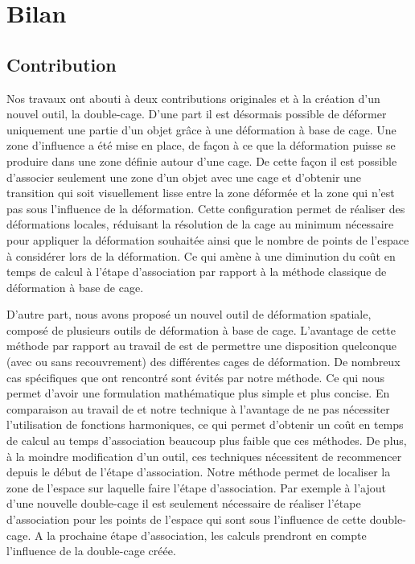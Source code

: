 
\def\baselinestretch{1}
\chapter{Bilan}
\ifpdf
\graphicspath{{Conclusions/ConclusionsFigs/PNG/}{Conclusions/ConclusionsFigs/PDF/}{Conclusions/ConclusionsFigs/}}
\else
\graphicspath{{Conclusions/ConclusionsFigs/EPS/}{Conclusions/ConclusionsFigs/}}
\fi

\section{Contribution}

Nos travaux ont abouti à deux contributions originales et à la création d'un
nouvel outil, la double-cage. D'une part il est désormais possible de déformer
uniquement une partie d'un objet grâce à une déformation à base de cage. Une
zone d'influence a été mise en place, de façon à ce que la déformation puisse
se produire dans une zone définie autour d'une cage. De cette façon il est
possible d'associer seulement une zone d'un objet avec une cage et d'obtenir
une transition qui soit visuellement lisse entre la zone déformée et la zone
qui n'est pas sous l'influence de la déformation. Cette configuration permet
de réaliser des déformations locales, réduisant la résolution de la cage au
minimum nécessaire pour appliquer la déformation souhaitée ainsi que le nombre
de points de l'espace à considérer lors de la déformation. Ce qui amène à une
diminution du coût en temps de calcul à l'étape d'association par rapport à la
méthode classique de déformation à base de cage.

D'autre part, nous avons proposé un nouvel outil de déformation spatiale,
composé de plusieurs outils de déformation à base de cage. L'avantage de cette
méthode par rapport au travail de \cite{GPCP13} est de permettre une
disposition quelconque (avec ou sans recouvrement) des différentes cages de
déformation. De nombreux cas spécifiques que \cite{GPCP13} ont rencontré sont
évités par notre méthode. Ce qui nous permet d'avoir une formulation
mathématique plus simple et plus concise. En comparaison au travail de
\cite{JBPS11} et \cite{GPCP13} notre technique à l'avantage de ne pas
nécessiter l'utilisation de fonctions harmoniques, ce qui permet d'obtenir un
coût en temps de calcul au temps d'association beaucoup plus faible que ces
méthodes. De plus, à la moindre modification d'un outil, ces techniques
nécessitent de recommencer depuis le début de l'étape d'association. Notre
méthode permet de localiser la zone de l'espace sur laquelle faire l'étape
d'association. Par exemple à l'ajout d'une nouvelle double-cage il est
seulement nécessaire de réaliser l'étape d'association pour les points de
l'espace qui sont sous l'influence de cette double-cage. A la prochaine étape
d'association, les calculs prendront en compte l'influence de la double-cage
créée.

